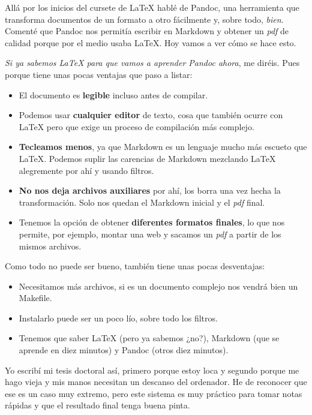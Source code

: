 Allá por los inicios del cursete de LaTeX hablé de Pandoc, una
herramienta que transforma documentos de un formato a otro fácilmente y,
sobre todo, \emph{bien}. Comenté que Pandoc nos permitía escribir en
Markdown y obtener un \emph{pdf} de calidad porque por el medio usaba
LaTeX. Hoy vamos a ver cómo se hace esto.

\emph{Si ya sabemos LaTeX para que vamos a aprender Pandoc ahora}, me
diréis. Pues porque tiene unas pocas ventajas que paso a listar:

\begin{itemize}
\item
  El documento es \textbf{legible} incluso antes de compilar.
\item
  Podemos usar \textbf{cualquier editor} de texto, cosa que también
  ocurre con LaTeX pero que exige un proceso de compilación más
  complejo.
\item
  \textbf{Tecleamos menos}, ya que Markdown es un lenguaje mucho más
  escueto que LaTeX. Podemos suplir las carencias de Markdown mezclando
  LaTeX alegremente por ahí y usando filtros.
\item
  \textbf{No nos deja archivos auxiliares} por ahí, los borra una vez
  hecha la transformación. Solo nos quedan el Markdown inicial y el
  \emph{pdf} final.
\item
  Tenemos la opción de obtener \textbf{diferentes formatos finales}, lo
  que nos permite, por ejemplo, montar una web y sacamos un \emph{pdf} a
  partir de los mismos archivos.
\end{itemize}

Como todo no puede ser bueno, también tiene unas pocas desventajas:

\begin{itemize}
\item
  Necesitamos más archivos, si es un documento complejo nos vendrá bien
  un Makefile.
\item
  Instalarlo puede ser un poco lío, sobre todo los filtros.
\item
  Tenemos que saber LaTeX (pero ya sabemos ¿no?), Markdown (que se
  aprende en diez minutos) y Pandoc (otros diez minutos).
\end{itemize}

Yo escribí mi tesis doctoral así, primero porque estoy loca y segundo
porque me hago vieja y mis manos necesitan un descanso del ordenador. He
de reconocer que ese es un caso muy extremo, pero este sistema es muy
práctico para tomar notas rápidas y que el resultado final tenga buena
pinta.

